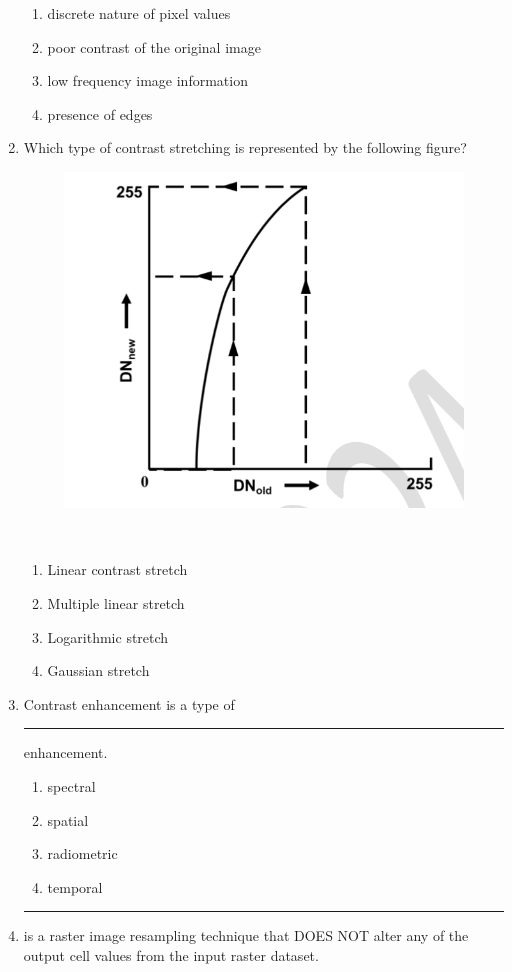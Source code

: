 \documentclass[12pt]{article}
\begin{document}
\begin{enumerate}
\begin{enumerate}
    \item discrete nature of pixel values 
   \item poor contrast of the original image 
   \item low frequency image information 
   \item presence of edges
\end{enumerate}


\item Which type of contrast stretching is represented by the following figure?  \\

\begin{figure}[H]
\centering
\includegraphics[width=0.5\linewidth]{Figs/LatexImage8.png}
\end{figure}  \\

\begin{enumerate}
    \item Linear contrast stretch 
   \item Multiple linear stretch 
   \item Logarithmic stretch 
   \item Gaussian stretch
\end{enumerate}

\item Contrast enhancement is a type of \rule{2cm}{0.15mm} enhancement.
\begin{enumerate}
    \item spectral 
   \item spatial 
   \item radiometric 
   \item temporal
\end{enumerate}

\item \rule{2cm}{0.15mm} is a raster image resampling technique that DOES NOT alter any of the
output cell values from the input raster dataset.  


\end{enumerate}
\end{document}
